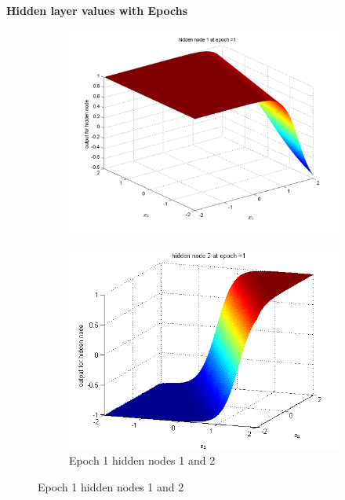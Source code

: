 \documentclass{article}
\begin{document}
\textbf{Hidden layer values with Epochs \\[10pt]}
\begin{figure}
\begin{subfigure}{.5\textwidth}
  \centering
  \includegraphics[width=.8\linewidth]{Classification/nonlinearlySeparable/h1_1}
 
\end{subfigure}%
\begin{subfigure}{.5\textwidth}
  \centering
  \includegraphics[width=.8\linewidth]{Classification/nonlinearlySeparable/h1_2}
\caption{Epoch 1 hidden nodes 1 and 2}
\end{subfigure}
\end{figure}
\end{document}
